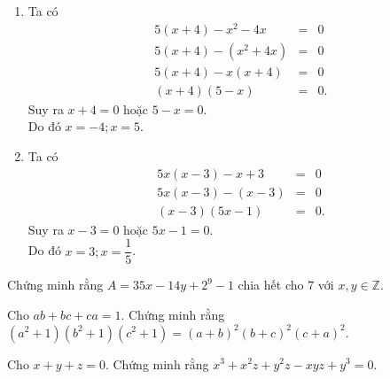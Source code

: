 \begin{vn}
{\begin{enumerate}
			Do đó $ x=-\dfrac{8}{3}; x=5; x=-5 $.
			\item Ta có
			{\allowdisplaybreaks \begin{eqnarray*}
				5(x+4)-x^2-4x&=&0\\
				5(x+4)-\left(x^2+4x\right)&=&0\\
				5(x+4)-x(x+4)&=&0\\
				(x+4)(5-x)&=&0.
			\end{eqnarray*}}Suy ra $ x+4=0 $ hoặc $ 5-x=0 $.\\
			Do đó $ x=-4; x=5 $.
			\item Ta có
			{\allowdisplaybreaks \begin{eqnarray*}
				5x(x-3)-x+3&=&0\\
				5x(x-3)-(x-3)&=&0\\
				(x-3)(5x-1)&=&0.
			\end{eqnarray*}}Suy ra $ x-3=0 $ hoặc $ 5x-1=0 $.\\
			Do đó $ x=3; x=\dfrac{1}{5} $.
		\end{enumerate}
	}
\end{vn}

\begin{vn}
Chứng minh rằng $ A=35x-14y+2^9-1 $ chia hết cho $ 7 $ với $ x, y\in \mathbb{Z}$.
\end{vn}

\begin{vn}
Cho  $ab+bc+ca=1$. Chứng minh rằng  $\left(a^2+1\right)\left(b^2+1\right)\left(c^2+1\right)=(a+b)^2(b+c)^2(c+a)^2$.
\end{vn}

\begin{vn}
	Cho $x+y+z=0$. Chứng minh rằng $x^3+x^2z+y^2z-xyz+y^3=0$.
\end{vn}

